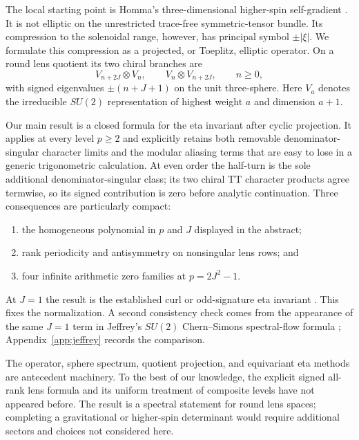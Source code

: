 \documentclass[11pt]{article}
\theoremstyle{definition}
\begin{document}
The local starting point is Homma's three-dimensional higher-spin
self-gradient \cite{Homma2001,HommaTomihisa2021}.  It is not elliptic on the
unrestricted trace-free symmetric-tensor bundle.  Its compression to the
solenoidal range, however, has principal symbol $\pm|\xi|$.  We formulate
this compression as a projected, or Toeplitz, elliptic operator.  On a round
lens quotient its two chiral branches are
\[
 V_{n+2J}\otimes V_n,
 \qquad
 V_n\otimes V_{n+2J},
 \qquad n\geq0,
\]
with signed eigenvalues $\pm(n+J+1)$ on the unit three-sphere.  Here $V_a$
denotes the irreducible $SU(2)$ representation of highest weight $a$ and
dimension $a+1$.

Our main result is a closed formula for the eta invariant after cyclic
projection.  It applies at every level $p\geq2$ and explicitly
retains both removable denominator-singular character limits and the modular
aliasing terms that are easy to lose in a generic trigonometric calculation.
At even order the half-turn is the sole additional denominator-singular
class; its two chiral TT character products agree termwise, so its signed
contribution is zero before analytic continuation.
Three consequences are particularly compact:

\begin{enumerate}[label=(\roman*)]
\item the homogeneous polynomial in $p$ and $J$ displayed in the abstract;
\item rank periodicity and antisymmetry on nonsingular lens rows; and
\item four infinite arithmetic zero families at $p=2J^2-1$.
\end{enumerate}

At $J=1$ the result is the established curl or odd-signature eta invariant
\cite{APS1975,Bar2019}.  This fixes the normalization.  A second consistency
check comes from the appearance of the same
$J=1$ term in Jeffrey's $SU(2)$ Chern--Simons spectral-flow formula
\cite{Jeffrey1992}; Appendix~\ref{app:jeffrey} records the comparison.

The operator, sphere spectrum, quotient projection, and equivariant eta
methods are antecedent machinery.  To the best of our knowledge, the explicit
signed all-rank lens formula and its uniform treatment of composite levels
have not appeared before.  The result is a spectral statement for round lens
spaces; completing a gravitational or higher-spin determinant would require
additional sectors and choices not considered here.
\end{document}
